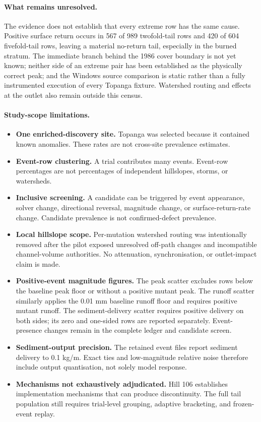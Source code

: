 \documentclass[11pt]{article}
\begin{document}
\paragraph{What remains unresolved.}
The evidence does not establish that every extreme row has the same cause.
Positive surface return occurs in 567 of 989 twofold-tail rows and 420 of 604
fivefold-tail rows, leaving a material no-return tail, especially in the
burned stratum. The immediate branch behind the 1986 cover boundary is not yet
known; neither side of an extreme pair has been established as the physically
correct peak; and the Windows source comparison is static rather than a fully
instrumented execution of every Topanga fixture. Watershed routing and effects
at the outlet also remain outside this census.

\paragraph{Study-scope limitations.}

\begin{itemize}
  \item \textbf{One enriched-discovery site.} Topanga was selected because it
    contained known anomalies. These rates are not cross-site prevalence
    estimates.
  \item \textbf{Event-row clustering.} A trial contributes many events.
    Event-row percentages are not percentages of independent hillslopes,
    storms, or watersheds.
  \item \textbf{Inclusive screening.} A candidate can be triggered by event
    appearance, solver change, directional reversal, magnitude change, or
    surface-return-rate change. Candidate prevalence is not confirmed-defect
    prevalence.
  \item \textbf{Local hillslope scope.} Per-mutation watershed routing was
    intentionally removed after the pilot exposed unresolved off-path changes
    and incompatible channel-volume authorities. No attenuation, synchronisation,
    or outlet-impact claim is made.
  \item \textbf{Positive-event magnitude figures.} The peak scatter excludes
    rows below the baseline peak floor or without a positive mutant peak. The
    runoff scatter similarly applies the 0.01 mm baseline runoff floor and
    requires positive mutant runoff. The sediment-delivery scatter requires
    positive delivery on both sides; its zero and one-sided rows are reported
    separately. Event-presence changes remain in the complete ledger and
    candidate screen.
  \item \textbf{Sediment-output precision.} The retained event files report
    sediment delivery to 0.1 kg/m. Exact ties and low-magnitude relative noise
    therefore include output quantisation, not solely model response.
  \item \textbf{Mechanisms not exhaustively adjudicated.} Hill 106 establishes
    implementation mechanisms that can produce discontinuity. The full tail
    population still requires trial-level grouping, adaptive bracketing, and
    frozen-event replay.
\end{itemize}
\end{document}
